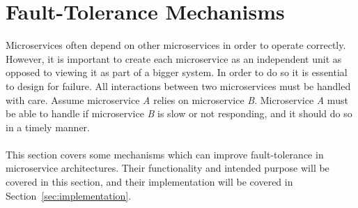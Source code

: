 \section{Fault-Tolerance Mechanisms}
Microservices often depend on other microservices in order to
operate correctly. However, it is important to create each
microservice as an independent unit as opposed to viewing it as part
of a bigger system. In order to do so it is essential to design for
failure. All interactions between two microservices must be handled
with care. Assume microservice \emph{A} relies on microservice
\emph{B}. Microservice \emph{A} must be able to handle if microservice
\emph{B} is slow or not responding, and it should do so in a timely
manner.
\\\\
This section covers some mechanisms which can improve fault-tolerance in
microservice architectures. Their functionality and intended purpose will
be covered in this section, and their implementation will be covered in 
Section~\ref{sec:implementation}.

